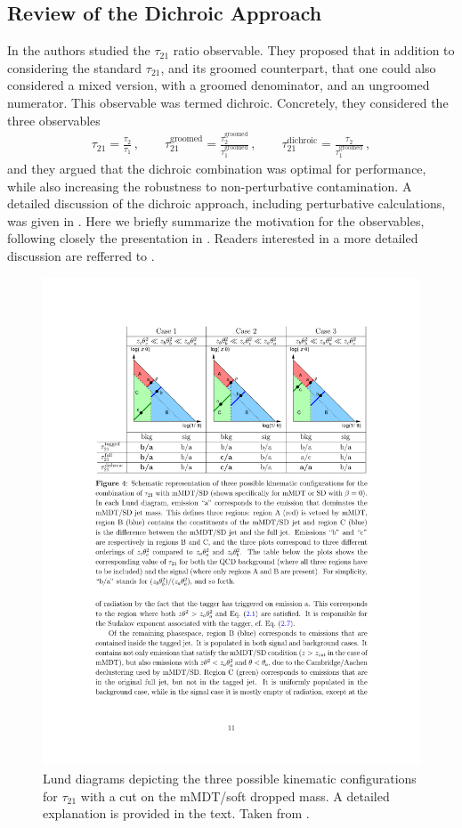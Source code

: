 \documentclass[11pt,letterpaper]{article}
\newcommand{\groomed}{\text{groomed}}
\begin{document}
\subsection{Review of the Dichroic Approach}\label{sec:dichroic}


In \cite{Salam:2016yht} the authors studied the $\tau_{21}$ ratio observable. They proposed that in addition to considering the standard $\tau_{21}$, and its groomed counterpart, that one could also considered a mixed version, with a groomed denominator, and an ungroomed numerator. This observable was termed dichroic. Concretely, they considered the three observables
\begin{align}
 \tau_{21} =\frac{\tau_2}{\tau_1}  \,, \qquad \tau_{21}^{\text{groomed}} =\frac{\tau_2^\groomed}{\tau_1^\groomed}\,, \qquad \tau_{21}^{\text{dichroic}} =\frac{\tau_2}{\tau_1^\groomed}\,,
\end{align}
and they argued that the dichroic combination was optimal for performance, while also increasing the robustness to non-perturbative contamination. A detailed discussion of the dichroic approach, including perturbative calculations, was given in \cite{Salam:2016yht}. Here we briefly summarize the motivation for the observables, following closely the presentation in \cite{Salam:2016yht}. Readers interested in a more detailed discussion are refferred to \cite{Salam:2016yht}.

\begin{figure}[t!]
\begin{center}
\includegraphics[width=0.75\columnwidth]{figures/dichroic_placeholder}
\end{center}
\caption{Lund diagrams depicting the three possible kinematic configurations for $\tau_{21}$ with a cut on the mMDT/soft dropped mass. A detailed explanation is provided in the text. Taken from \cite{Salam:2016yht}.}
\label{fig:dichroic}
\end{figure}
\end{document}
